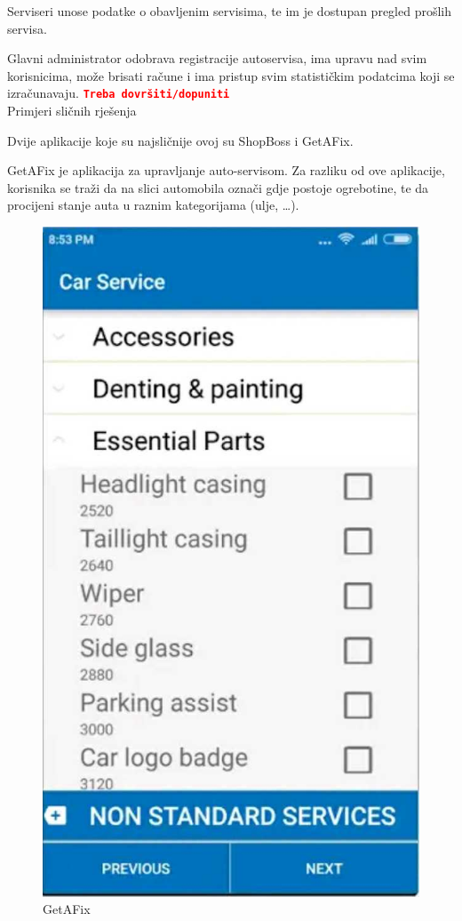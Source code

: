 		Serviseri unose podatke o obavljenim servisima, te im je dostupan pregled prošlih servisa.
		
		Glavni administrator odobrava registracije autoservisa, ima upravu nad svim korisnicima, može brisati račune i ima pristup svim statističkim podatcima koji se izračunavaju. \textbf{\texttt{\textcolor{red}{Treba dovršiti/dopuniti}}} \\
		
		\Large Primjeri sličnih rješenja
		
		\normalsize Dvije aplikacije koje su najsličnije ovoj su ShopBoss i GetAFix. 
		
		GetAFix je aplikacija za upravljanje auto-servisom. Za razliku od ove aplikacije, korisnika se traži da na slici automobila označi gdje postoje ogrebotine, te da procijeni stanje auta u raznim kategorijama (ulje, \ldots).
		
		\begin{figure}[H]
			\includegraphics[scale=0.2]{slike/getafix.JPG}
			\centering
			\caption{GetAFix}
			\label{fig:idk}
		\end{figure}  
		
